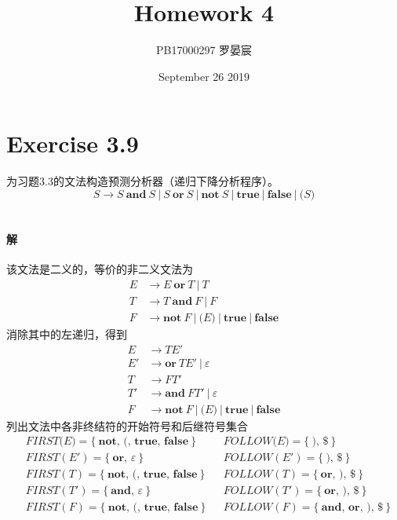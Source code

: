 \documentclass{article}
\title{Homework 4}
\author{PB17000297 罗晏宸}
\date{September 26 2019}
\begin{document}
\maketitle

\section{Exercise 3.9}
为习题3.3的文法构造预测分析器（递归下降分析程序）。
\begin{equation*}
    S \rightarrow S\ \textbf{and}\ S\ |\ S\ \textbf{or}\ S\ |\ \textbf{not}\ S\ |\ \textbf{true}\ |\ \textbf{false}\ |\ \texttt{(}S\texttt{)}
\end{equation*}
\\

\paragraph{解}
该文法是二义的，等价的非二义文法为
\begin{align*}
    E &\rightarrow E\ \textbf{or}\ T\ |\ T \\
    T &\rightarrow T\ \textbf{and}\ F\ |\ F \\
    F &\rightarrow \textbf{not}\ F\ |\ \texttt{(}E\texttt{)}\ |\ \textbf{true}\ |\ \textbf{false}
\end{align*}
消除其中的左递归，得到
\begin{align*}
    E &\rightarrow TE' \\
    E' &\rightarrow \textbf{or}\ TE'\ |\ \varepsilon \\
    T &\rightarrow FT' \\
    T' &\rightarrow \textbf{and}\ FT'\ |\ \varepsilon \\
    F &\rightarrow \textbf{not}\ F\ |\ \texttt{(}E\texttt{)}\ |\ \textbf{true}\ |\ \textbf{false}
\end{align*}
列出文法中各非终结符的开始符号和后继符号集合
\begin{align*}
    &FIRST\texttt{(}E\texttt{)} = \big\{\ \textbf{not},\,\texttt{(},\,\textbf{true},\,\textbf{false}\ \big\} &&FOLLOW\texttt{(}E\texttt{)} = \big\{\ \texttt{)},\,\texttt{\$} \ \big\} \\
    &FIRST(E') = \big\{\ \textbf{or},\,\varepsilon \ \big\} &&FOLLOW(E') = \big\{\ \texttt{)},\,\texttt{\$}\ \big\} \\
    &FIRST(T) = \big\{\ \textbf{not},\,\texttt{(},\,\textbf{true},\,\textbf{false}\ \big\} &&FOLLOW(T) = \big\{\ \textbf{or},\,\texttt{)},\,\texttt{\$}\ \big\} \\
    &FIRST(T') = \big\{\ \textbf{and},\,\varepsilon \ \big\} &&FOLLOW(T') = \big\{\ \textbf{or},\,\texttt{)},\,\texttt{\$}\ \big\} \\
    &FIRST(F) = \big\{\ \textbf{not},\,\texttt{(},\,\textbf{true},\,\textbf{false} \ \big\} &&FOLLOW(F) = \big\{\ \textbf{and},\,\textbf{or},\,\texttt{)},\,\texttt{\$} \ \big\}
\end{align*}
\end{document}
